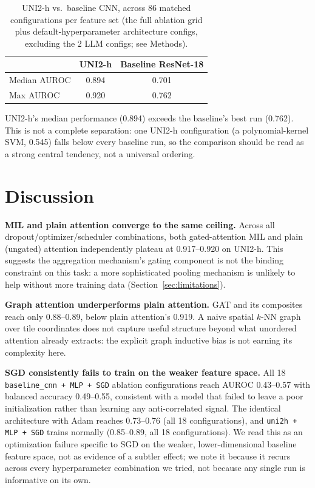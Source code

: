 \documentclass{article}
\begin{document}
\begin{table}[h]
\caption{UNI2-h vs.\ baseline CNN, across 86 matched configurations per feature set (the full ablation grid plus default-hyperparameter architecture configs, excluding the 2 LLM configs; see Methods).}
\label{tab:comparison}
\centering
\begin{tabular}{lcc}
\toprule
 & UNI2-h & Baseline ResNet-18 \\
\midrule
Median AUROC & 0.894 & 0.701 \\
Max AUROC    & 0.920 & 0.762 \\
\bottomrule
\end{tabular}
\end{table}

UNI2-h's median performance (0.894) exceeds the baseline's best run (0.762). This is not a complete separation: one UNI2-h configuration (a polynomial-kernel SVM, 0.545) falls below every baseline run, so the comparison should be read as a strong central tendency, not a universal ordering.

\section{Discussion}
\label{sec:discussion}

\textbf{MIL and plain attention converge to the same ceiling.} Across all dropout/optimizer/scheduler combinations, both gated-attention MIL and plain (ungated) attention independently plateau at 0.917--0.920 on UNI2-h. This suggests the aggregation mechanism's gating component is not the binding constraint on this task: a more sophisticated pooling mechanism is unlikely to help without more training data (Section~\ref{sec:limitations}).

\textbf{Graph attention underperforms plain attention.} GAT and its composites reach only 0.88--0.89, below plain attention's 0.919. A naive spatial $k$-NN graph over tile coordinates does not capture useful structure beyond what unordered attention already extracts: the explicit graph inductive bias is not earning its complexity here.

\textbf{SGD consistently fails to train on the weaker feature space.} All 18 \texttt{baseline\_cnn + MLP + SGD} ablation configurations reach AUROC 0.43--0.57 with balanced accuracy 0.49--0.55, consistent with a model that failed to leave a poor initialization rather than learning any anti-correlated signal. The identical architecture with Adam reaches 0.73--0.76 (all 18 configurations), and \texttt{uni2h + MLP + SGD} trains normally (0.85--0.89, all 18 configurations). We read this as an optimization failure specific to SGD on the weaker, lower-dimensional baseline feature space, not as evidence of a subtler effect; we note it because it recurs across every hyperparameter combination we tried, not because any single run is informative on its own.
\end{document}
